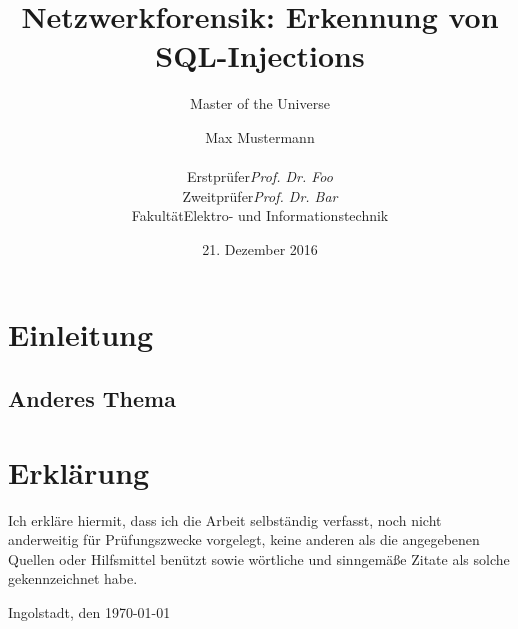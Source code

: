 

\title{Netzwerkforensik: Erkennung von SQL-Injections}
\subtitle{Master of the Universe}
\subject{Masterarbeit}

\author{Max Mustermann \\[0.5cm]
\begin{tabular}{rl}
Erstprüfer & \emph{Prof. Dr. Foo}\\
Zweitprüfer & \emph{Prof. Dr. Bar}\\
Fakultät & {Elektro- und Informationstechnik}
\end{tabular}
}

\date{21. Dezember 2016}



\tableofcontents
\clearpage
\listoffigures
\clearpage

\chapter{Einleitung}
\blindtext
\section{Anderes Thema}
\blindtext[3]

\printbibliography


\chapter*{Erklärung}
Ich erkläre hiermit, dass ich die Arbeit selbständig verfasst, noch nicht anderweitig für Prüfungszwecke vorgelegt, keine anderen als die angegebenen Quellen oder Hilfsmittel benützt sowie wörtliche und sinngemäße Zitate als solche gekennzeichnet habe.

\vspace{3\baselineskip}
\noindent Ingolstadt, den \today

\par\noindent\makebox[2.5in]{} \hfill\makebox[2.0in]{\hrulefill}%
\\\hspace*{8cm}{Max Mustermann}




